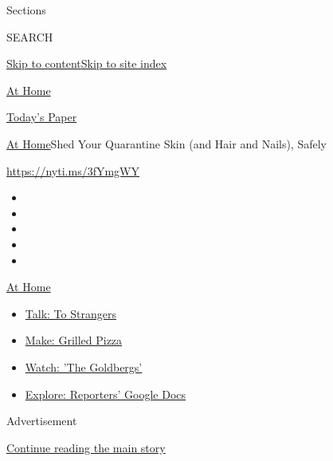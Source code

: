 Sections

SEARCH

\protect\hyperlink{site-content}{Skip to
content}\protect\hyperlink{site-index}{Skip to site index}

\href{https://www.nytimes.com/spotlight/at-home}{At Home}

\href{https://myaccount.nytimes.com/auth/login?response_type=cookie\&client_id=vi}{}

\href{https://www.nytimes.com/section/todayspaper}{Today's Paper}

\href{/spotlight/at-home}{At Home}\textbar{}Shed Your Quarantine Skin
(and Hair and Nails), Safely

\url{https://nyti.ms/3fYmgWY}

\begin{itemize}
\item
\item
\item
\item
\item
\end{itemize}

\href{https://www.nytimes.com/spotlight/at-home?action=click\&pgtype=Article\&state=default\&region=TOP_BANNER\&context=at_home_menu}{At
Home}

\begin{itemize}
\tightlist
\item
  \href{https://www.nytimes.com/2020/08/03/well/family/the-benefits-of-talking-to-strangers.html?action=click\&pgtype=Article\&state=default\&region=TOP_BANNER\&context=at_home_menu}{Talk:
  To Strangers}
\item
  \href{https://www.nytimes.com/2020/08/01/at-home/coronavirus-make-pizza-on-a-grill.html?action=click\&pgtype=Article\&state=default\&region=TOP_BANNER\&context=at_home_menu}{Make:
  Grilled Pizza}
\item
  \href{https://www.nytimes.com/2020/07/31/arts/television/goldbergs-abc-stream.html?action=click\&pgtype=Article\&state=default\&region=TOP_BANNER\&context=at_home_menu}{Watch:
  'The Goldbergs'}
\item
  \href{https://www.nytimes.com/interactive/2020/at-home/even-more-reporters-editors-diaries-lists-recommendations.html?action=click\&pgtype=Article\&state=default\&region=TOP_BANNER\&context=at_home_menu}{Explore:
  Reporters' Google Docs}
\end{itemize}

Advertisement

\protect\hyperlink{after-top}{Continue reading the main story}

